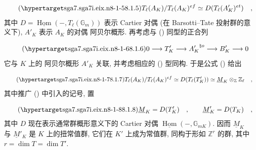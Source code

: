 \begin{equation}\tag{\SGARefTarget{sga7.sga7i.eix.n8-1-5}{8.1.5}}
T_\ell(A_K)/T_\ell(A_K)^{ef}
 \simeq D(T_\ell(A'_K)^{et}) \quad ,
\end{equation}
其中 $D=\underline{\operatorname{Hom}}(-,T_\ell(\mathbb{G}_m))$ 表示 Cartier 对偶 (在 Barsotti--Tate 投射群的意义下), $A'_K$ 表示 $A_K$ 的对偶 阿贝尔概形. 再考虑与 () 同型的正合列

\begin{equation}\tag{\SGARefTarget{sga7.sga7i.eix.n8-1-6}{8.1.6}}
0 \longrightarrow T'_K \longrightarrow {A'_K}^{\natural o}
 \longrightarrow B'_K \longrightarrow 0
\end{equation}
它与 $K$ 上的 阿贝尔概形 $A'_K$ 关联, 并考虑相应的 () 型同构. 于是公式 () 给出

\begin{equation}\tag{\SGARefTarget{sga7.sga7i.eix.n8-1-7}{8.1.7}}
T_\ell(A_K)/T_\ell(A_K)^{ef}
 \simeq D(T_\ell(T'_K))
 \simeq \underline{M}_K\otimes_{\mathbb{Z}}\mathbb{Z}_\ell \quad ,
\end{equation}
其中推广 () 中引入的记号, 置

\begin{equation}\tag{\SGARefTarget{sga7.sga7i.eix.n8-1-8}{8.1.8}}
\underline{M}_K=D(T'_K) \quad , \qquad
\underline{M}'_K=D(T_K) \quad ,
\end{equation}
其中 $D$ 现在表示通常群概形意义下的 Cartier 对偶 $\underline{\operatorname{Hom}}(-,\mathbb{G}_{mK})$. 因而 $\underline{M}_K$ 与 $\underline{M}'_K$ 是 $K$ 上的扭常值群, 它们在 $K'$ 上成为常值群, 同构于形如 $\mathbb{Z}^{r}$ 的群, 其中 $r=\dim T=\dim T'$.



